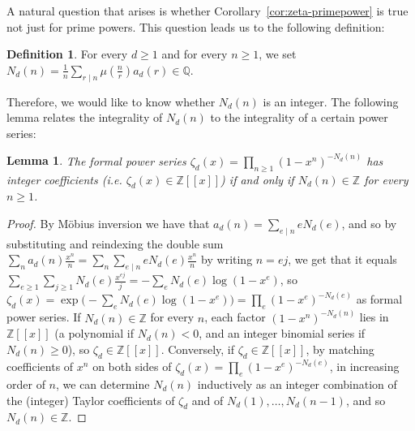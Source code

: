 \documentclass{article}
\theoremstyle{plain}
\newtheorem{lemma}[theorem]{Lemma}
\theoremstyle{definition}
\newtheorem{definition}[theorem]{Definition}
\theoremstyle{remark}
\newcommand{\Z}{\mathbb{Z}}
\newcommand{\Q}{\mathbb{Q}}
\begin{document}
A natural question that arises is whether Corollary~\ref{cor:zeta-primepower} is true not just for prime powers. This question leads us to the following definition:

\begin{definition}
For every $d \geq 1$ and for every $n \geq 1$, we set $N_d(n)=\tfrac1n\sum_{r\mid n}\mu(\frac{n}{r})a_d(r)\in\Q$.
\end{definition}

Therefore, we would like to know whether $N_d(n)$ is an integer. The following lemma relates the integrality of $N_d(n)$ to the integrality of a certain power series:

\begin{lemma}\label{lem:zetaformal}
 The formal power series $\zeta_d(x)=\prod_{n\ge1}(1-x^n)^{-N_d(n)}$ has integer coefficients (i.e. $\zeta_d (x) \in \Z[[x]]$) if and only if $N_d(n)\in\Z$ for every $n\ge1$.
\end{lemma}
\begin{proof}
By M\"obius inversion we have that $a_d(n)=\sum_{e\mid n}eN_d(e)$, and so by substituting and reindexing the double sum $\sum_{n}a_d(n)\frac{x^n}{n}=\sum_n\sum_{e\mid n}eN_d(e)\frac{x^n}{n}$ by writing $n=ej$, we get that it equals $\sum_{e\geq 1}\sum_{j\ge1}N_d(e)\frac{x^{ej}}{j}=-\sum_eN_d(e)\log(1-x^e)$, so $\zeta_d(x)=\exp\big(-\sum_eN_d(e)\log(1-x^e)\big)=\prod_e(1-x^e)^{-N_d(e)}$ as formal power series. If $N_d(n)\in\Z$ for every $n$, each factor $(1-x^n)^{-N_d(n)}$ lies in $\Z[[x]]$ (a polynomial if $N_d(n)<0$, and an integer binomial series if $N_d(n)\ge0$), so $\zeta_d\in\Z[[x]]$. Conversely, if $\zeta_d\in\Z[[x]]$, by matching coefficients of $x^n$ on both sides of $\zeta_d(x)=\prod_e(1-x^e)^{-N_d(e)}$, in increasing order of $n$, we can determine $N_d(n)$ inductively as an integer combination of the (integer) Taylor coefficients of $\zeta_d$ and of $N_d(1),\dots,N_d(n-1)$, and so $N_d(n)\in\Z$.
\end{proof}
\end{document}
